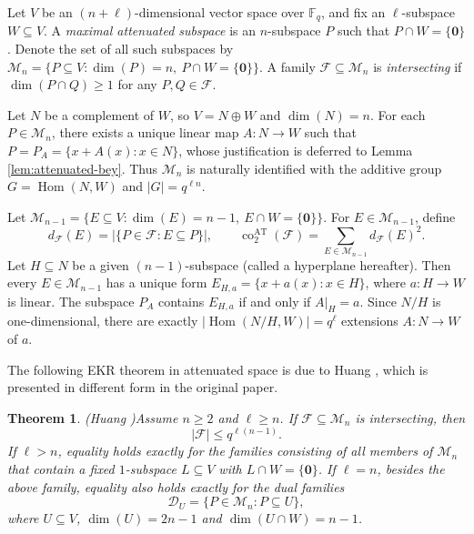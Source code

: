 \documentclass[11pt]{article}
\newtheorem{theorem}{Theorem}
\theoremstyle{definition}
\newcommand{\Fq}{\mathbb F_q}
\newcommand{\Hom}{\operatorname{Hom}}
\begin{document}
Let $V$ be an $(n+\ell)$-dimensional vector space over $\Fq$, and fix an $\ell$-subspace $W\subseteq V$. A \emph{maximal attenuated subspace} is an $n$-subspace $P$ such that $P\cap W=\{\bm{0}\}$. Denote the set of all such subspaces by $\mathcal M_n=\{P\subseteq V:\dim (P)=n,\ P\cap W=\{\bm{0}\}\}$. A family $\mathcal F\subseteq\mathcal M_n$ is \emph{intersecting} if
$\dim(P\cap Q)\ge1$ for any $P,Q\in\mathcal F$.

Let $N$ be a complement of $W$, so $V=N\oplus W$ and $\dim (N)=n$.  For each $P\in\mathcal M_n$, there exists a unique linear map $A:N\to W$ such that $P=P_A=\{x+A(x):x\in N\}$, whose justification is deferred to Lemma \ref{lem:attenuated-bey}. Thus $\mathcal M_n$ is naturally identified with the additive group $G=\Hom(N,W)$ and $|G|=q^{\ell n}$.

Let $\mathcal M_{n-1}=\{E\subseteq V:\dim (E)=n-1,\ E\cap W=\{\bm{0}\}\}$. For $E\in\mathcal M_{n-1}$, define
\[
d_{\mathcal F}(E)=|\{P\in\mathcal F:E\subseteq P\}|,
\qquad
\operatorname{co}^{\mathrm{AT}}_2(\mathcal F)=\sum_{E\in\mathcal M_{n-1}}d_{\mathcal F}(E)^2.
\]
Let $H\subseteq N$ be a given $(n-1)$-subspace (called a hyperplane hereafter). Then every $E\in\mathcal M_{n-1}$ has a unique form $E_{H,a}=\{x+a(x):x\in H\}$, where $a:H\to W$ is linear. 
The subspace $P_A$ contains $E_{H,a}$ if and only if $A|_H=a$. Since $N/H$ is one-dimensional, there are exactly $|\Hom(N/H,W)|=q^\ell$ extensions $A:N\to W$ of $a$.

The following EKR theorem in attenuated space is due to Huang \cite{Huang1987}, which is presented in different form in the original paper.


\begin{theorem}(Huang \cite{Huang1987})\label{thm:Huang}
Assume $n\ge2$ and $\ell\ge n$.  If $\mathcal F\subseteq\mathcal M_n$ is intersecting, then
\[
|\mathcal F|\le q^{\ell(n-1)}.
\]
If $\ell>n$, equality holds exactly for the families consisting of all members of $\mathcal M_n$ that contain a fixed $1$-subspace $L\subseteq V$ with $L\cap W=\{\bm{0}\}$. If $\ell=n$, besides the above family, equality also holds exactly for the dual families
\[
\mathcal D_U=\{P\in\mathcal M_n:P\subseteq U\},
\]
where $U\subseteq V$, $\dim (U)=2n-1$ and $\dim(U\cap W)=n-1$.
\end{theorem}
\end{document}
